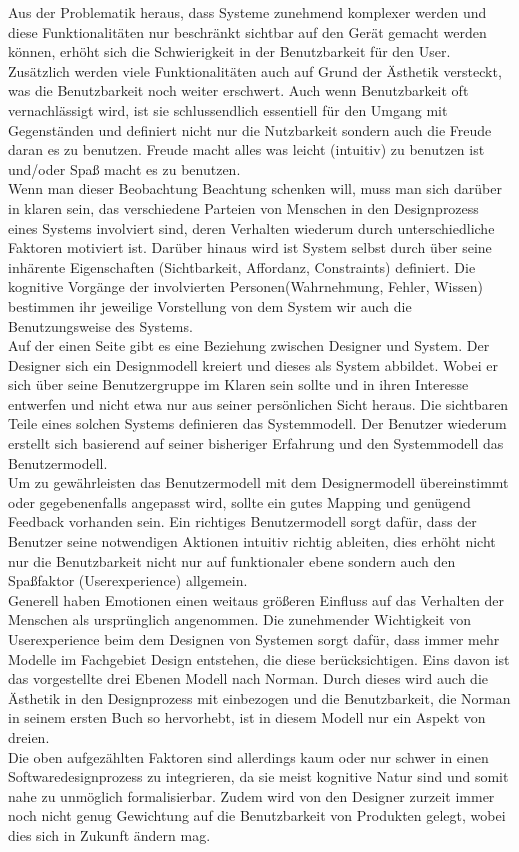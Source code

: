 \documentclass[parskip,headsepline, headtopline, %
footsepline, oneside, 12pt, headings=small]{scrreprt}
\begin{document}
Aus der Problematik heraus, dass Systeme zunehmend komplexer werden und diese Funktionalitäten nur beschränkt sichtbar auf den Gerät gemacht werden können, erhöht sich die Schwierigkeit in der Benutzbarkeit für den User. Zusätzlich werden viele Funktionalitäten auch auf Grund der Ästhetik versteckt, was die  Benutzbarkeit noch weiter erschwert. Auch wenn Benutzbarkeit oft vernachlässigt wird, ist sie schlussendlich essentiell für den Umgang mit Gegenständen und definiert nicht nur die Nutzbarkeit sondern auch die Freude daran es zu benutzen. Freude macht alles was leicht (intuitiv) zu benutzen ist und/oder Spaß macht es zu benutzen. \\
Wenn man dieser Beobachtung Beachtung schenken will, muss man sich darüber in klaren sein, das verschiedene Parteien von Menschen in den Designprozess  eines Systems involviert sind, deren Verhalten wiederum durch unterschiedliche Faktoren motiviert ist. Darüber hinaus wird ist System selbst durch über seine inhärente Eigenschaften (Sichtbarkeit, Affordanz, Constraints) definiert. Die kognitive Vorgänge der involvierten Personen(Wahrnehmung, Fehler, Wissen) bestimmen ihr jeweilige Vorstellung von dem System wir auch die Benutzungsweise des Systems. \\ 
Auf der einen Seite gibt es eine Beziehung zwischen Designer und System. Der Designer sich ein Designmodell kreiert und dieses als System abbildet. Wobei er sich über seine Benutzergruppe im Klaren sein sollte und in ihren Interesse entwerfen und nicht etwa nur aus seiner persönlichen Sicht heraus.
Die sichtbaren Teile eines solchen Systems definieren das Systemmodell. Der Benutzer wiederum erstellt sich basierend auf seiner bisheriger Erfahrung und den Systemmodell das Benutzermodell.\\
Um zu gewährleisten das Benutzermodell mit dem Designermodell übereinstimmt oder gegebenenfalls angepasst wird, sollte ein gutes Mapping und genügend Feedback vorhanden sein. Ein richtiges Benutzermodell sorgt dafür, dass der Benutzer seine notwendigen Aktionen intuitiv richtig ableiten, dies erhöht nicht nur die Benutzbarkeit nicht nur auf funktionaler ebene sondern auch den Spaßfaktor (Userexperience) allgemein. \\ 
Generell haben Emotionen einen weitaus größeren Einfluss auf das Verhalten der Menschen als ursprünglich angenommen. Die zunehmender Wichtigkeit von Userexperience beim dem Designen von Systemen sorgt dafür, dass immer mehr Modelle im Fachgebiet Design entstehen, die diese berücksichtigen.
Eins davon ist das vorgestellte drei Ebenen Modell nach Norman. Durch dieses wird auch die Ästhetik in den Designprozess mit einbezogen und die Benutzbarkeit, die Norman in seinem ersten Buch so hervorhebt, ist in diesem Modell nur ein Aspekt von dreien. \\
Die oben aufgezählten Faktoren sind allerdings kaum oder nur schwer in einen Softwaredesignprozess zu integrieren, da sie meist kognitive Natur sind und somit nahe zu unmöglich formalisierbar. Zudem  wird von den Designer zurzeit immer noch nicht genug Gewichtung auf die Benutzbarkeit von Produkten gelegt, wobei dies sich in Zukunft ändern mag.
\end{document}
